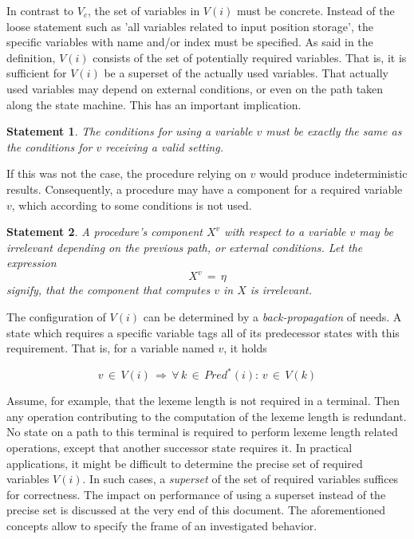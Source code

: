 \documentclass[12pt,a4paper]{scrartcl}
\newtheorem{statement}{Statement}
\begin{document}
In contrast to $V_c$, the set of variables in $V(i)$ must be concrete.  Instead
of the loose statement such as 'all variables related to input position
storage', the specific variables with name and/or index must be specified.  As
said in the definition, $V(i)$ consists of the set of potentially required
variables. That is, it is sufficient for $V(i)$ be a superset of the actually
used variables. That actually used variables may depend on external conditions,
or even on the path taken along the state machine. This has an important
implication. 

\begin{statement} \label{stm:relevance-condition}
    The conditions for using a variable $v$ must be exactly the same as the
    conditions for $v$ receiving a valid setting. 
\end{statement}

If this was not the case, the procedure relying on $v$ would produce
indeterministic results. Consequently, a procedure may have a component for a
required variable $v$, which according to some conditions is not used.

\begin{statement}
    A procedure's component $X^v$ with respect to a variable $v$ may be irrelevant
    depending on the previous path, or external conditions. Let the expression
    \begin{equation}
        X^v \,=\,\eta
    \end{equation}
    signify, that the component that computes $v$ in $X$ is irrelevant.
\end{statement}

The configuration of $V(i)$ can be determined by a \textit{back-propagation} of
needs. A state which requires a specific variable tags all of its predecessor
states with this requirement. That is, for a variable named $v$, it holds

\begin{equation}
    v\,\in\,V(i)\,\Rightarrow\,\forall\,k\,\in\,Pred^*(i):\,v\,\in\,V(k)
\end{equation}

Assume, for example, that the lexeme length is not required in a terminal. Then
any operation contributing to the computation of the lexeme length is
redundant.  No state on a path to this terminal is required to perform lexeme
length related operations, except that another successor state requires it.  In
practical applications, it might be difficult to determine the precise set of
required variables $V(i)$. In such cases, a \textit{superset} of the set of
required variables suffices for correctness. The impact on performance of using
a superset instead of the precise set is discussed at the very end of this
document.  The aforementioned concepts allow to specify the frame of an
investigated behavior.  
\end{document}
